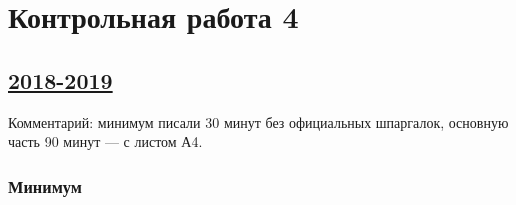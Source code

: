 \newpage
\thispagestyle{empty}
\section{Контрольная работа 4}


\subsection[2018-2019]{\hyperref[sec:sol_kr_04_2018_2019]{2018-2019}}
\label{sec:kr_04_2018_2019}

Комментарий: минимум писали 30 минут без официальных шпаргалок, основную часть 90 минут — с листом А4. 

\subsubsection*{Минимум}


